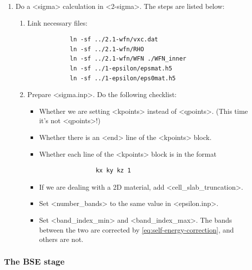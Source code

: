 \documentclass[hyperref, a4paper, 12pt]{report}
\def\texttt#1{<#1>}%
\newcommand{\shortcode}[1]{\texttt{#1}}
\begin{document}
\begin{enumerate}
\begin{enumerate}
    \end{enumerate}
    \item Do a \shortcode{sigma} calculation in \shortcode{2-sigma}. The steps are listed below:
    \begin{enumerate}
        \item Link necessary files:
        \begin{lstlisting}
            ln -sf ../2.1-wfn/vxc.dat 
            ln -sf ../2.1-wfn/RHO 
            ln -sf ../2.1-wfn/WFN ./WFN_inner
            ln -sf ../1-epsilon/epsmat.h5 
            ln -sf ../1-epsilon/eps0mat.h5 
        \end{lstlisting}
        \item Prepare \shortcode{sigma.inp}. Do the following checklist:
        \begin{itemize}
            \item Whether we are setting \shortcode{kpoints} instead of \shortcode{qpoints}.
            (This time it's not \shortcode{qpoints}!)
            \item Whether there is an \shortcode{end} line of the \shortcode{kpoints} block.
            \item Whether each line of the \shortcode{kpoints} block is in the format
            \begin{lstlisting}
                kx ky kz 1
            \end{lstlisting}
            \item If we are dealing with a 2D material, add \shortcode{cell_slab_truncation}.
            \item Set \shortcode{number_bands} to the same value in \shortcode{epsilon.inp}.
            \item Set \shortcode{band_index_min} and \shortcode{band_index_max}.
            The bands between the two are corrected by \eqref{eq:self-energy-correction},
            and others are not.
        \end{itemize}
    \end{enumerate}
\end{enumerate}

\subsubsection{The BSE stage}
\end{document}
